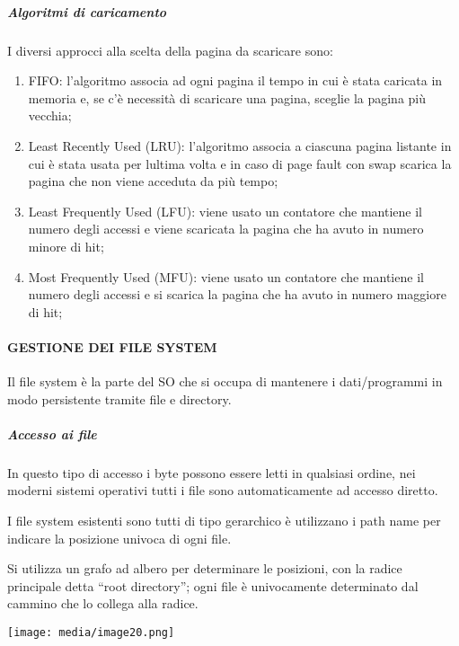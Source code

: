 \subparagraph{\texorpdfstring{\emph{Algoritmi di
caricamento}}{Algoritmi di caricamento}}\label{algoritmi-di-caricamento}

I diversi approcci alla scelta della pagina da scaricare sono:

\begin{enumerate}
\def\labelenumi{\arabic{enumi}.}
\item
  FIFO: l'algoritmo associa ad ogni pagina il tempo in cui è stata
  caricata in memoria e, se c'è necessità di scaricare una pagina,
  sceglie la pagina più vecchia;
\item
  Least Recently Used (LRU): l'algoritmo associa a ciascuna pagina
  l\textquotesingle istante in cui è stata usata per
  l\textquotesingle ultima volta e in caso di page fault con swap
  scarica la pagina che non viene acceduta da più tempo;
\item
  Least Frequently Used (LFU): viene usato un contatore che mantiene il
  numero degli accessi e viene scaricata la pagina che ha avuto in
  numero minore di hit;
\item
  Most Frequently Used (MFU): viene usato un contatore che mantiene il
  numero degli accessi e si scarica la pagina che ha avuto in numero
  maggiore di hit;
\end{enumerate}

\paragraph{GESTIONE DEI FILE SYSTEM}\label{gestione-dei-file-system}

Il file system è la parte del SO che si occupa di mantenere i
dati/programmi in modo persistente tramite file e directory.

\subparagraph{Accesso ai file}\label{accesso-ai-file}

In questo tipo di accesso i byte possono essere letti in qualsiasi
ordine, nei moderni sistemi operativi tutti i file sono automaticamente
ad accesso diretto.

I file system esistenti sono tutti di tipo gerarchico è utilizzano i
path name per indicare la posizione univoca di ogni file.

Si utilizza un grafo ad albero per determinare le posizioni, con la
radice principale detta ``root directory''; ogni file è univocamente
determinato dal cammino che lo collega alla radice.

\texttt{[image: media/image20.png]}


